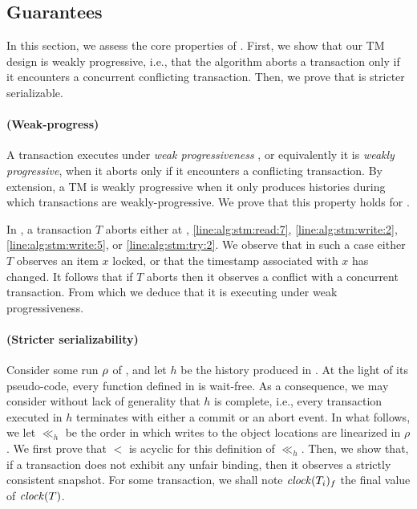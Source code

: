 \subsection{Guarantees}

In this section, we assess the core properties of .
First, we show that our TM design is weakly progressive, i.e., that the algorithm aborts a transaction only if it encounters a concurrent conflicting transaction.
Then, we prove that  is stricter serializable.

\paragraph{(Weak-progress)}
A transaction executes under \emph{weak progressiveness} \cite{Guerraoui:2009}, or equivalently it is \emph{weakly progressive}, when it aborts only if it encounters a conflicting transaction.
By extension, a TM is weakly progressive when it only produces histories during which transactions are weakly-progressive.
We prove that this property holds for .

In , a transaction $T$ aborts either at , \ref{line:alg:stm:read:7}, \ref{line:alg:stm:write:2}, \ref{line:alg:stm:write:5}, or \ref{line:alg:stm:try:2}.
We observe that in such a case either $T$ observes an item $x$ locked, or that the timestamp associated with $x$ has changed.
It follows that if $T$ aborts then it observes a conflict with a concurrent transaction.
From which we deduce that it is executing under weak progressiveness.

\paragraph{(Stricter serializability)}
Consider some run $\run$ of , and let $h$ be the history produced in \run.
At the light of its pseudo-code, every function defined in  is wait-free.
As a consequence, we may consider without lack of generality that $h$ is complete, i.e., every transaction executed in $h$ terminates with either a commit or an abort event.
In what follows, we let $\ll_h$ be the order in which writes to the object locations are linearized in $\rho$.
We first prove that $<$ is acyclic for this definition of $\ll_h$.
Then, we show that, if a transaction does not exhibit any unfair binding, then it observes a strictly consistent snapshot.
For some transaction, we shall note $\clockOf{T_i}_f$ the final value of $\clockOf{T}$.

